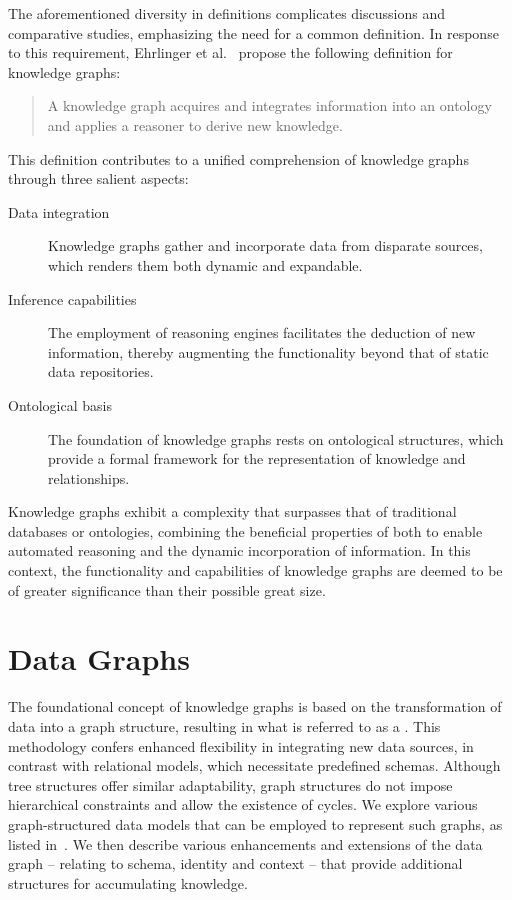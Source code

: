The aforementioned diversity in definitions complicates discussions and comparative studies, emphasizing the need for a common definition. In response to this requirement, Ehrlinger et al.~\cite{Ehrlinger2016TowardsAD} propose the following definition for knowledge graphs:
\begin{center}
    \begin{quote}
        A knowledge graph acquires and integrates information into an ontology and applies a reasoner to derive new knowledge.
    \end{quote}
\end{center}
This definition contributes to a unified comprehension of knowledge graphs through three salient aspects:
\begin{description}
    \item[Data integration] Knowledge graphs gather and incorporate data from disparate sources, which renders them both dynamic and expandable.
    \item[Inference capabilities] The employment of reasoning engines facilitates the deduction of new information, thereby augmenting the functionality beyond that of static data repositories.
    \item[Ontological basis] The foundation of knowledge graphs rests on ontological structures, which provide a formal framework for the representation of knowledge and relationships.
\end{description}

Knowledge graphs exhibit a complexity that surpasses that of traditional databases or ontologies, combining the beneficial properties of both to enable automated reasoning and the dynamic incorporation of information. In this context, the functionality and capabilities of knowledge graphs are deemed to be of greater significance than their possible great size.

\section{Data Graphs}\label{data-graphs}
The foundational concept of knowledge graphs is based on the transformation of data into a graph structure, resulting in what is referred to as a . This methodology confers enhanced flexibility in integrating new data sources, in contrast with relational models, which necessitate predefined schemas. Although tree structures offer similar adaptability, graph structures do not impose hierarchical constraints and allow the existence of cycles. We explore  various graph-structured data models that can be employed to represent such graphs, as listed in~\cite{Hogan2021KGs}. We then describe various enhancements and extensions of the data graph – relating to schema, identity and context – that provide additional structures for accumulating knowledge.

